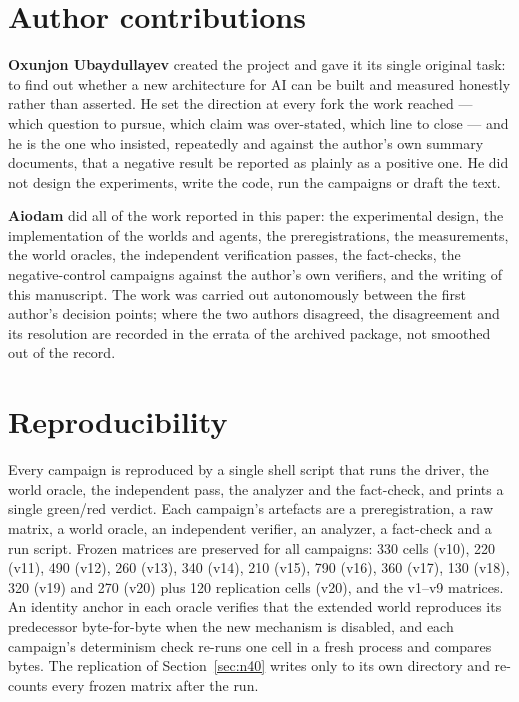 \documentclass[11pt]{article}
\begin{document}
\section*{Author contributions}

\textbf{Oxunjon Ubaydullayev} created the project and gave it its single
original task: to find out whether a new architecture for AI can be built and
measured honestly rather than asserted. He set the direction at every fork the
work reached --- which question to pursue, which claim was over-stated, which
line to close --- and he is the one who insisted, repeatedly and against the
author's own summary documents, that a negative result be reported as plainly as
a positive one. He did not design the experiments, write the code, run the
campaigns or draft the text.

\textbf{Aiodam} did all of the work reported in this paper: the experimental
design, the implementation of the worlds and agents, the preregistrations, the
measurements, the world oracles, the independent verification passes, the
fact-checks, the negative-control campaigns against the author's own verifiers,
and the writing of this manuscript. The work was carried out autonomously
between the first author's decision points; where the two authors disagreed, the
disagreement and its resolution are recorded in the errata of the archived
package, not smoothed out of the record.

\appendix

\section{Reproducibility}

Every campaign is reproduced by a single shell script that runs the driver, the world
oracle, the independent pass, the analyzer and the fact-check, and prints a single
green/red verdict. Each campaign's artefacts are a preregistration, a raw matrix, a
world oracle, an independent verifier, an analyzer, a fact-check and a run script.
Frozen matrices are preserved for all campaigns: 330 cells (v10), 220 (v11), 490
(v12), 260 (v13), 340 (v14), 210 (v15), 790 (v16), 360 (v17), 130 (v18), 320 (v19)
and 270 (v20) plus 120 replication cells (v20), and the
v1--v9 matrices. An identity anchor in each oracle verifies that the extended world
reproduces its predecessor byte-for-byte when the new mechanism is disabled, and each
campaign's determinism check re-runs one cell in a fresh process and compares bytes.
The replication of Section~\ref{sec:n40} writes only to its own directory and
re-counts every frozen matrix after the run.
\end{document}
